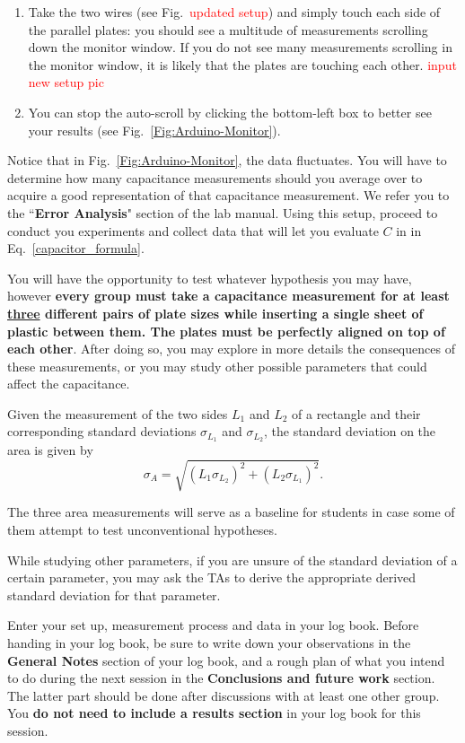 \documentclass[12pt]{report}
\def \todo #1{\textcolor{red}{#1}}
\begin{document}
\begin{enumerate}
\item Take the two wires (see Fig.~\todo{updated setup}) and simply touch each side of the parallel plates: you should see a multitude of measurements scrolling down the monitor window. If you do not see many measurements scrolling in the monitor window, it is likely that the plates are touching each other. \todo{input new setup pic}
\item You can stop the auto-scroll by clicking the bottom-left box to better see your results (see Fig.~\ref{Fig:Arduino-Monitor}).
\end{enumerate}

Notice that in Fig.~\ref{Fig:Arduino-Monitor}, the data fluctuates. You will have to determine how many capacitance measurements should you average over to acquire a good representation of that capacitance measurement. We refer you to the ``\textbf{Error Analysis}" section of the lab manual. Using this setup, proceed to conduct you experiments and collect data that will let you evaluate $C$ in in Eq.~\ref{capacitor_formula}. 

You will have the opportunity to test whatever hypothesis you may have, however \textbf{every group must take a capacitance measurement for at least \underline{three} different pairs of plate sizes while inserting a single sheet of plastic between them. The plates must be perfectly aligned on top of each other}. After doing so, you may explore in more details the consequences of these measurements, or you may study other possible parameters that could affect the capacitance.

Given the measurement of the two sides $L_1$ and $L_2$ of a rectangle and their corresponding standard deviations $\sigma_{L_1}$ and $\sigma_{L_2}$, the standard deviation on the area is given by
\begin{equation}
\sigma_A = \sqrt{ \left( L_1 \sigma_{L_2} \right)^2 + \left( L_2 \sigma_{L_1} \right)^2 }.
\end{equation}

\begin{tcolorbox}
The three area measurements will serve as a baseline for students in case some of them attempt to test unconventional hypotheses.
\end{tcolorbox}

While studying other parameters, if you are unsure of the standard deviation of a certain parameter, you may ask the TAs to derive the appropriate derived standard deviation for that parameter.

Enter your set up, measurement process and data in your log book. Before handing in your log book, be sure to write down your observations in the \textbf{General Notes} section of your log book, and a rough plan of what you intend to do during the next session in the \textbf{Conclusions and future work} section. The latter part should be done after discussions with at least one other group. You \textbf{do not need to include a results section} in your log book for this session.
\end{document}

